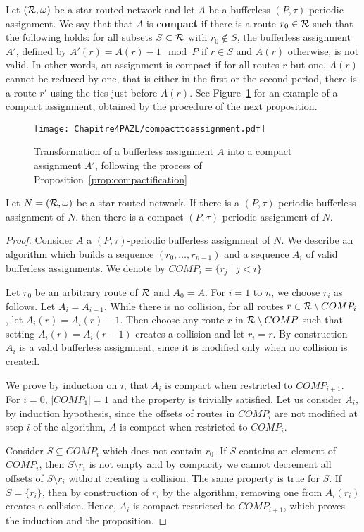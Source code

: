 Let $({\cal R},\omega)$ be a star routed network and let $A$ be a bufferless $(P,\tau)$-periodic assignment.
We say that that $A$ is \textbf{compact} if there is a route $r_0 \in \cal{R}$ such that the following holds: for all subsets $S\subset \cal{R}$ with $r_0 \notin S$, the bufferless assignment $A'$, defined by $A'(r) = A(r) - 1 \mod P$ if $r \in S$ and $A(r)$ otherwise, is not valid. In other words, an assignment is compact if for all routes $r$ but one, $A(r)$ cannot be reduced by one, that is either in the first or the second period, there is a route $r'$ using the tics just before $A(r)$. See Figure~\ref{fig:compact} for an example of a compact assignment, obtained by the procedure of the next proposition. 
  \begin{figure}
      \begin{center} 
      \texttt{[image: Chapitre4PAZL/compacttoassignment.pdf]}
      \end{center}
      \caption{Transformation of a bufferless assignment $A$ into a compact assignment $A'$, following the process of Proposition~\ref{prop:compactification}}
      \label{fig:compact}
      \end{figure}
\begin{proposition}\label{prop:compactification}
Let $N = ({\cal R}, \omega)$ be a star routed network. If there is a $(P,\tau)$-periodic bufferless assignment of $N$, then there is a compact $(P,\tau)$-periodic assignment of $N$.
\end{proposition}
\begin{proof}
Consider $A$ a $(P,\tau)$-periodic bufferless assignment of $N$.
We describe an algorithm which builds a sequence $(r_0,\dots,r_{n-1})$ and a sequence  
$A_i$ of valid bufferless assignments. We denote by $COMP_i = \{ r_j \mid j < i\}$

Let $r_0$ be an arbitrary route of ${\cal R}$ and $A_0 = A$. For $i = 1$ to $n$, we choose $r_i$ as follows.
Let $A_{i} = A_{i-1}$. While there is no collision, for all routes $r \in {\cal R} \setminus COMP_i$, let $A_i(r) = A_i(r) - 1$. Then choose any route $r$ in ${\cal R} \setminus COMP$ such that setting $A_i(r) = A_i(r-1)$ creates a collision and let $r_i = r$. By construction $A_i$ is a valid bufferless assignment, since it is modified only when no collision is created.

We prove by induction on $i$, that $A_i$ is compact when restricted to $COMP_{i+1}$.
For $i = 0$, $|COMP_1| = 1$ and the property is trivially satisfied. Let us consider $A_i$,
by induction hypothesis, since the offsets of routes in $COMP_{i}$ are not modified at step $i$ of the algorithm, $A$ is compact when restricted to $COMP_{i}$. 

 Consider $S \subseteq COMP_i$ which does not contain $r_0$. If $S$ contains
an element of $COMP_{i}$, then $S \setminus {r_i}$ is not empty and by compacity we cannot decrement all offsets of $S\setminus {r_i}$ without creating a collision. The same property is true for $S$. If $S = \{r_i\}$, then by construction of $r_i$ by the algorithm, removing one from $A_i(r_i)$ creates a collision. Hence,
$A_i$ is compact restricted to $COMP_{i+1}$, which proves the induction and the proposition.
\end{proof}

